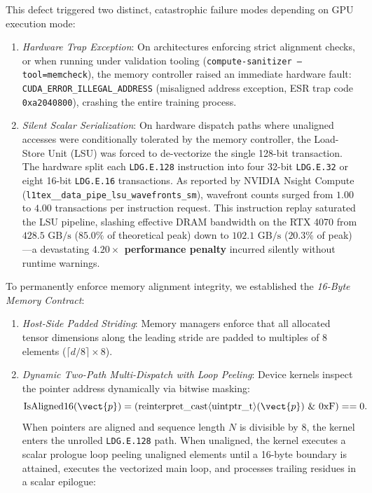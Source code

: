This defect triggered two distinct, catastrophic failure modes depending on GPU execution mode:
\begin{enumerate}
    \item \emph{Hardware Trap Exception}: On architectures enforcing strict alignment checks, or when running under validation tooling (\texttt{compute-sanitizer --tool=memcheck}), the memory controller raised an immediate hardware fault: \texttt{CUDA\_ERROR\_ILLEGAL\_ADDRESS} (misaligned address exception, ESR trap code \texttt{0xa2040800}), crashing the entire training process.
    \item \emph{Silent Scalar Serialization}: On hardware dispatch paths where unaligned accesses were conditionally tolerated by the memory controller, the Load-Store Unit (LSU) was forced to de-vectorize the single 128-bit transaction. The hardware split each \texttt{LDG.E.128} instruction into four 32-bit \texttt{LDG.E.32} or eight 16-bit \texttt{LDG.E.16} transactions. As reported by NVIDIA Nsight Compute (\texttt{l1tex\_\_data\_pipe\_lsu\_wavefronts\_sm}), wavefront counts surged from $1.00$ to $4.00$ transactions per instruction request. This instruction replay saturated the LSU pipeline, slashing effective DRAM bandwidth on the RTX 4070 from $428.5\text{ GB/s}$ ($85.0\%$ of theoretical peak) down to $102.1\text{ GB/s}$ ($20.3\%$ of peak)---a devastating \textbf{$4.20\times$ performance penalty} incurred silently without runtime warnings.
\end{enumerate}

To permanently enforce memory alignment integrity, we established the \emph{\neuralops{} 16-Byte Memory Contract}:
\begin{enumerate}
    \item \emph{Host-Side Padded Striding}: Memory managers enforce that all allocated tensor dimensions along the leading stride are padded to multiples of 8 elements ($\lceil d / 8 \rceil \times 8$).
    \item \emph{Dynamic Two-Path Multi-Dispatch with Loop Peeling}: Device kernels inspect the pointer address dynamically via bitwise masking:
    \begin{equation}
        \operatorname{IsAligned16}(\vect{p}) = \left(\operatorname{reinterpret\_cast}\langle\operatorname{uintptr\_t}\rangle(\vect{p}) \ \& \ 0\text{xF}\right) == 0.
    \end{equation}
    When pointers are aligned and sequence length $N$ is divisible by 8, the kernel enters the unrolled \texttt{LDG.E.128} path. When unaligned, the kernel executes a scalar prologue loop peeling unaligned elements until a 16-byte boundary is attained, executes the vectorized main loop, and processes trailing residues in a scalar epilogue:
\end{enumerate}

